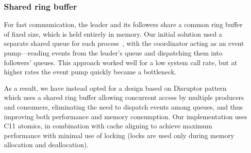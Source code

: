 

\subsubsection{Shared ring buffer}
\label{sec:ring}

For fast communication, the leader and its followers share a common
ring buffer of fixed size, which is held entirely in memory.  Our
initial solution used a separate shared queue for each
process~\cite{fastforward,mcringbuffer}, with the
coordinator acting as an event pump---reading events from the leader's
queue and dispatching them into followers' queues.  This approach
worked well for a low system call rate, but at higher rates the event
pump quickly became a bottleneck.  

As a result, we have instead opted for a design based on Disruptor
pattern~\cite{disruptor} which uses a shared ring buffer allowing concurrent
access by multiple producers and consumers, eliminating the need to dispatch
events among queues, and thus improving both performance and memory
consumption.  Our implementation uses C11 atomics, 
in combination with cache aligning to
achieve maximum performance with minimal use of locking (locks are used only
during memory allocation and deallocation).

